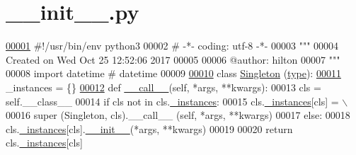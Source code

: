 \hypertarget{start__time_2____init_____8py_source}{}\section{\+\_\+\+\_\+init\+\_\+\+\_\+.\+py}
\label{start__time_2____init_____8py_source}

\begin{DoxyCode}
\hyperlink{namespacestart__time}{00001} \textcolor{comment}{#!/usr/bin/env python3}
00002 \textcolor{comment}{# -*- coding: utf-8 -*-}
00003 \textcolor{stringliteral}{"""}
00004 \textcolor{stringliteral}{Created on Wed Oct 25 12:52:06 2017}
00005 \textcolor{stringliteral}{}
00006 \textcolor{stringliteral}{@author: hilton}
00007 \textcolor{stringliteral}{"""}
00008 \textcolor{keyword}{import} datetime \textcolor{comment}{# datetime}
00009 
\hyperlink{classstart__time_1_1_singleton}{00010} \textcolor{keyword}{class }\hyperlink{classstart__time_1_1_singleton}{Singleton} (\hyperlink{classtype}{type}):
\hyperlink{classstart__time_1_1_singleton_a541fb2b583fdf801b3c77804fe9900b1}{00011}     \_instances = \{\}
\hyperlink{classstart__time_1_1_singleton_af0e193a3b8d4b62db86957e47c60e16f}{00012}     \textcolor{keyword}{def }\hyperlink{classstart__time_1_1_singleton_af0e193a3b8d4b62db86957e47c60e16f}{\_\_call\_\_}(self, *args, **kwargs):
00013         cls = self.\_\_class\_\_
00014         \textcolor{keywordflow}{if} cls \textcolor{keywordflow}{not} \textcolor{keywordflow}{in} cls.\hyperlink{classstart__time_1_1_singleton_a541fb2b583fdf801b3c77804fe9900b1}{\_instances}:
00015             cls.\hyperlink{classstart__time_1_1_singleton_a541fb2b583fdf801b3c77804fe9900b1}{\_instances}[cls] = \(\backslash\)
00016                 super (Singleton, cls).\_\_call\_\_ (self, *args, **kwargs)
00017         \textcolor{keywordflow}{else}:
00018             cls.\hyperlink{classstart__time_1_1_singleton_a541fb2b583fdf801b3c77804fe9900b1}{\_instances}[cls].\hyperlink{namespacestart__time_a9c9bd378729a13c96a22c8b079ea172c}{\_\_init\_\_}(*args, **kwargs)
00019                     
00020         \textcolor{keywordflow}{return} cls.\hyperlink{classstart__time_1_1_singleton_a541fb2b583fdf801b3c77804fe9900b1}{\_instances}[cls]

\end{DoxyCode}
